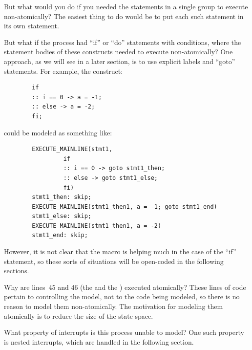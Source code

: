 \QuickQ{}
	But what would you do if you needed the statements in a single
	 group to execute non-atomically?
\QuickA{}
	The easiest thing to do would be to put
	each such statement in its own 
	statement.

\QuickQ{}
	But what if the  process had
	``if'' or ``do'' statements with conditions,
	where the statement bodies of these constructs
	needed to execute non-atomically?
\QuickA{}
	One approach, as we will see in a later section,
	is to use explicit labels and ``goto'' statements.
	For example, the construct:

	\vspace{5pt}
	\begin{minipage}[t]{\columnwidth}
	\scriptsize
	\begin{verbatim}
		if
		:: i == 0 -> a = -1;
		:: else -> a = -2;
		fi;
	\end{verbatim}
	\end{minipage}
	\vspace{5pt}

	could be modeled as something like:

	\vspace{5pt}
	\begin{minipage}[t]{\columnwidth}
	\scriptsize
	\begin{verbatim}
		EXECUTE_MAINLINE(stmt1,
				 if
				 :: i == 0 -> goto stmt1_then;
				 :: else -> goto stmt1_else;
				 fi)
		stmt1_then: skip;
		EXECUTE_MAINLINE(stmt1_then1, a = -1; goto stmt1_end)
		stmt1_else: skip;
		EXECUTE_MAINLINE(stmt1_then1, a = -2)
		stmt1_end: skip;
	\end{verbatim}
	\end{minipage}
	\vspace{5pt}

	However, it is not clear that the macro is helping much in the case
	of the ``if'' statement, so these sorts of situations will
	be open-coded in the following sections.

\QuickQ{}
	Why are lines~45 and 46 (the 
	and the ) executed atomically?
\QuickA{}
	These lines of code pertain to controlling the
	model, not to the code being modeled, so there is no reason to
	model them non-atomically.
	The motivation for modeling them atomically is to reduce the size
	of the state space.

\QuickQ{}
	What property of interrupts is this 
	process unable to model?
\QuickA{}
	One such property is nested interrupts,
	which are handled in the following section.

